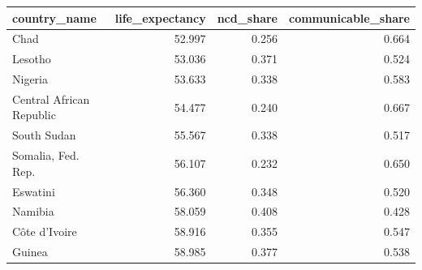 \begin{tabular}{lrrr}
\toprule
country_name & life_expectancy & ncd_share & communicable_share \\
\midrule
Chad & 52.997 & 0.256 & 0.664 \\
Lesotho & 53.036 & 0.371 & 0.524 \\
Nigeria & 53.633 & 0.338 & 0.583 \\
Central African Republic & 54.477 & 0.240 & 0.667 \\
South Sudan & 55.567 & 0.338 & 0.517 \\
Somalia, Fed. Rep. & 56.107 & 0.232 & 0.650 \\
Eswatini & 56.360 & 0.348 & 0.520 \\
Namibia & 58.059 & 0.408 & 0.428 \\
Côte d'Ivoire & 58.916 & 0.355 & 0.547 \\
Guinea & 58.985 & 0.377 & 0.538 \\
\bottomrule
\end{tabular}
